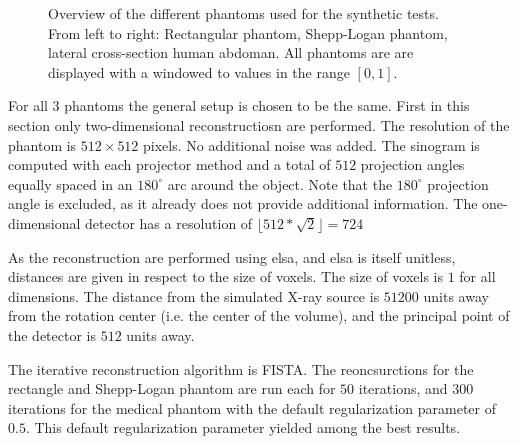 \begin{figure}[h]
	\centering
	\caption{Overview of the different phantoms used for the synthetic tests. From left to
		right: Rectangular phantom, Shepp-Logan phantom, lateral cross-section human
		abdoman. All phantoms are are displayed with a windowed to values in the range \([0,
				1]\).}\label{fig:experiment_overview_phantoms}
\end{figure}

For all 3 phantoms the general setup is chosen to be the same. First in this section only
two-dimensional reconstructiosn are performed. The resolution of the phantom is \(512 \times 512\)
pixels. No additional noise was added. The sinogram is computed with each projector method and a
total of \(512\) projection angles equally spaced in an \(180^\circ\) arc around the object. Note
that the \(180^\circ\) projection angle is excluded, as it already does not provide additional
information. The one-dimensional detector has a resolution of \(\lfloor 512 * \sqrt{2} \rfloor =
724\)

As the reconstruction are performed using elsa, and elsa is itself unitless, distances are given in
respect to the size of voxels.   The size of voxels is \(1\) for all
dimensions. The distance from the simulated X-ray source is \(51200\) units away from the rotation
center (i.e. the center of the volume), and the principal point of the detector is \(512\) units
away.

The iterative reconstruction algorithm is \gls{FISTA}. The reoncsurctions for the rectangle and
Shepp-Logan phantom are run each for \(50\) iterations, and \(300\) iterations for the medical
phantom with the default regularization parameter of \(0.5\). This default regularization parameter
yielded among the best results.

